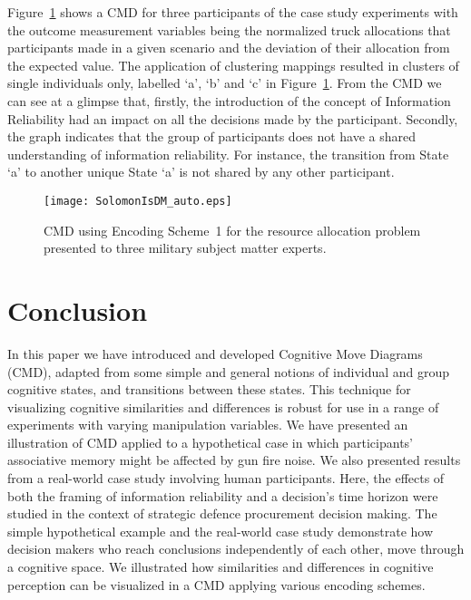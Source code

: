 \documentclass[conference]{IEEEtran}
\begin{document}
Figure~\ref{fig:mvcmexample} shows a CMD for three participants of the case study experiments with
the outcome measurement variables being the normalized truck allocations that participants made in
a given scenario and the deviation of their allocation from the expected value. The application of
clustering mappings resulted in clusters of single individuals only, labelled `a', `b' and `c' in
Figure~\ref{fig:mvcmexample}. From the CMD we can see at a glimpse that, firstly, the introduction
of the concept of Information Reliability had an impact on all the decisions made by the
participant. Secondly, the graph indicates that the group of participants does not have a shared
understanding of information reliability. For instance, the transition from State `a' to another
unique State `a' is not shared by any other participant.

\begin{figure}[!t]
\centering
\texttt{[image: SolomonIsDM\_auto.eps]}
\caption{CMD using Encoding Scheme~1 for the resource allocation problem presented to three
military subject matter experts.} \label{fig:mvcmexample}
\end{figure}

\section{Conclusion}\label{sec:Conclusion}

In this paper we have introduced and developed Cognitive Move Diagrams (CMD), adapted from some
simple and general notions of individual and group cognitive states, and transitions between these
states. This technique for visualizing cognitive similarities and differences is robust for use in
a range of experiments with varying manipulation variables. We have presented an illustration of
CMD applied to a hypothetical case in which participants' associative memory might be affected by
gun fire noise. We also presented results from a real-world case study involving human
participants. Here, the effects of both the framing of information reliability and a decision's
time horizon were studied in the context of strategic defence procurement decision making. The
simple hypothetical example and the real-world case study demonstrate how decision makers who reach
conclusions independently of each other, move through a cognitive space. We illustrated how
similarities and differences in cognitive perception can be visualized in a CMD applying various
encoding schemes.
\end{document}
